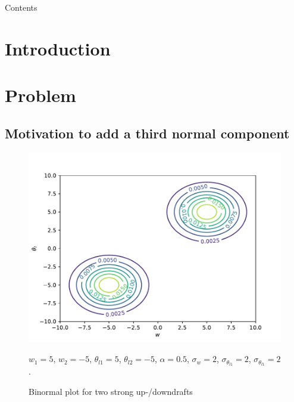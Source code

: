 \documentclass[10pt]{beamer}
\title{\mytitle}
\author[\myauthor]{\myauthor}
\institute[UWM]{University of Wisconsin Milwaukee}
\date[May 3, 2024]{May 3, 2024}
\numberwithin{equation}{section}
\begin{document}
    \frame{\titlepage}

    \begin{frame}{Contents}
        \tableofcontents
    \end{frame}


    \section{Introduction}\label{sec:introduction}
    \begin{frame}{}

    \end{frame}


    \section{Problem}\label{sec:problem}

    \subsection{Motivation to add a third normal component}
    \label{subsec:motivation-to-add-a-third-normal-component}

    \begin{frame}
        \begin{figure}[!htb]
            \centering
            \includegraphics[width=.5\textwidth]{include/figures/plot1}
            \caption{Binormal plot for two strong up-/downdrafts}
            \label{fig:plot1}
            $w_1 = 5$, $w_2 = -5$, $\theta_{l1} = 5$, $\theta_{l2} = -5$,
            $\alpha = 0.5$, $\sigma_w = 2$, $\sigma_{\theta_{l1}} = 2$, $\sigma_{\theta_{l1}} = 2$.
        \end{figure}
    \end{frame}
\end{document}
